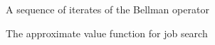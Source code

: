 \begin{frame}
    
    \begin{figure}
        \centering
        \caption{\label{f:iid_job_search_1} A sequence of iterates of the Bellman operator}
    \end{figure}


\end{frame}

\begin{frame}

    \begin{figure}
        \centering
        \caption{\label{f:iid_job_search_3} The approximate value function for job
        search}
    \end{figure}

\end{frame}



